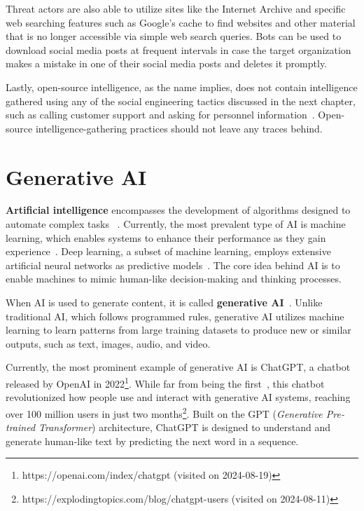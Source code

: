 Threat actors are also able to utilize sites like the Internet Archive and specific web searching features such as Google’s cache to find websites and other material that is no longer accessible via simple web search queries. Bots can be used to download social media posts at frequent intervals in case the target organization makes a mistake in one of their social media posts and deletes it promptly.

Lastly, open-source intelligence, as the name implies, does not contain intelligence gathered using any of the social engineering tactics discussed in the next chapter, such as calling customer support and asking for personnel information~\citep{hadnagy_Social_Engineering_The_Science_2018}. Open-source intelligence-gathering practices should not leave any traces behind.





\section{Generative AI}

\textbf{Artificial intelligence} encompasses the development of algorithms designed to automate complex tasks ~\citep{mirsky_Threat_Offensive_AI_Organizations_2023}. Currently, the most prevalent type of AI is machine learning, which enables systems to enhance their performance as they gain experience~\citep{fakhouri_AI_Driven_Solutions_SE_Attacks_2024}. Deep learning, a subset of machine learning, employs extensive artificial neural networks as predictive models~\citep{goodfellow_Generative_Adversarial_Networks_2020}. The core idea behind AI is to enable machines to mimic human-like decision-making and thinking processes.


When AI is used to generate content, it is called \textbf{generative AI}~\citep{goodfellow_Generative_Adversarial_Networks_2020}. Unlike traditional AI, which follows programmed rules, generative AI utilizes machine learning to learn patterns from large training datasets to produce new or similar outputs, such as text, images, audio, and video.

Currently, the most prominent example of generative AI is ChatGPT, a chatbot released by OpenAI in 2022\footnote{https://openai.com/index/chatgpt (visited on 2024-08-19)}. While far from being the first~\citep{weizenbaum_ELIZA_1996}, this chatbot revolutionized how people use and interact with generative AI systems, reaching over 100 million users in just two months\footnote{https://explodingtopics.com/blog/chatgpt-users (visited on 2024-08-11)}. Built on the GPT (\textit{Generative Pre-trained Transformer}) architecture, ChatGPT is designed to understand and generate human-like text by predicting the next word in a sequence.

